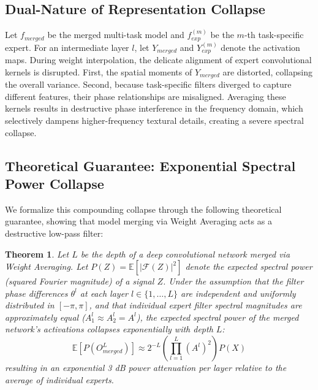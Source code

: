 \documentclass{article}
\newtheorem{theorem}{Theorem}
\begin{document}
\subsection{Dual-Nature of Representation Collapse}
Let $f_{merged}$ be the merged multi-task model and $f_{exp}^{(m)}$ be the $m$-th task-specific expert. For an intermediate layer $l$, let $Y_{merged}$ and $Y_{exp}^{(m)}$ denote the activation maps.
During weight interpolation, the delicate alignment of expert convolutional kernels is disrupted. First, the spatial moments of $Y_{merged}$ are distorted, collapsing the overall variance. Second, because task-specific filters diverged to capture different features, their phase relationships are misaligned. Averaging these kernels results in destructive phase interference in the frequency domain, which selectively dampens higher-frequency textural details, creating a severe spectral collapse.

\subsection{Theoretical Guarantee: Exponential Spectral Power Collapse}
We formalize this compounding collapse through the following theoretical guarantee, showing that model merging via Weight Averaging acts as a destructive low-pass filter:
\begin{theorem}
\label{thm:spectral_collapse}
Let $L$ be the depth of a deep convolutional network merged via Weight Averaging. Let $P(Z) = \mathbb{E}[|\mathcal{F}(Z)|^2]$ denote the expected spectral power (squared Fourier magnitude) of a signal $Z$. Under the assumption that the filter phase differences $\theta^l$ at each layer $l \in \{1, \dots, L\}$ are independent and uniformly distributed in $[-\pi, \pi]$, and that individual expert filter spectral magnitudes are approximately equal ($A^l_1 \approx A^l_2 = A^l$), the expected spectral power of the merged network's activations collapses exponentially with depth $L$:
\begin{equation}
    \mathbb{E}[P(O^L_{merged})] \approx 2^{-L} \left( \prod_{l=1}^L (A^l)^2 \right) P(X)
\end{equation}
resulting in an exponential 3 dB power attenuation per layer relative to the average of individual experts.
\end{theorem}
\end{document}
